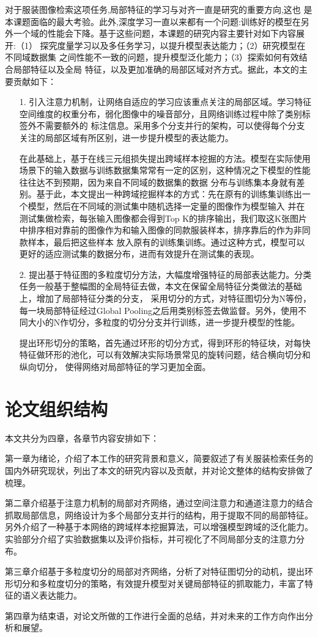 对于服装图像检索这项任务,局部特征的学习与对齐一直是研究的重要方向,这也
是本课题面临的最大考验。此外,深度学习一直以来都有一个问题:训练好的模型在另
外一个域的性能会下降。基于这些问题，本课题的研究内容主要针对如下内容展开:（1）
探究度量学习以及多任务学习，以提升模型表达能力；（2）研究模型在不同域数据集
之间性能不一致的问题，提升模型泛化能力；（3）探索如何有效结合局部特征以及全局
特征，以及更加准确的局部区域对齐方式。据此，本文的主要贡献如下：
\begin{itemize}
  \item [1.] 引入注意力机制，让网络自适应的学习应该重点关注的局部区域。学习特征空间维度的权重分布，弱化图像中的噪音部分，且网络训练过程中除了类别标签外不需要额外的
    标注信息。采用多个分支并行的架构，可以使得每个分支关注的局部区域有所区别，进一步提升模型的表达能力。
    
    在此基础上，基于在线三元组损失提出跨域样本挖掘的方法。模型在实际使用场景下的输入数据与训练数据集常常有一定的区别，这种情况之下模型的性能往往达不到预期，因为来自不同域的数据集的数据
    分布与训练集本身就有差别。基于此，本文提出一种跨域挖掘样本的方式：先在原有的训练集训练出一个模型，然后在不同域的测试集中随机选择一定量的图像作为模型输入
    并在测试集做检索，每张输入图像都会得到Top K的排序输出，我们取这K张图片中排序相对靠前的图像作为和输入图像的同款服装样本，排序靠后的作为非同款样本，最后把这些样本
    放入原有的训练集训练。通过这种方式，模型可以更好的适应测试集的数据分布，进而有效提升在测试集的表现。
  
  \item [2.] 提出基于特征图的多粒度切分方法，大幅度增强特征的局部表达能力。分类任务一般基于整幅图的全局特征去做，本文在保留全局特征分类做法的基础上，增加了局部特征分类的分支，
    采用切分的方式，对特征图切分为N等份，每一块局部特征经过Global Pooling之后用类别标签去做监督。另外，使用不同大小的N作切分，多粒度的切分分支并行训练，进一步提升模型的性能。

    提出环形切分的策略，首先通过环形的切分方式，得到环形的特征块，对每快特征做环形的池化，可以有效解决实际场景常见的旋转问题，结合横向切分和纵向切分，
    使得网络对局部特征的学习更加全面。

\end{itemize}

\section{论文组织结构}
本文共分为四章，各章节内容安排如下：

第一章为绪论，介绍了本工作的研究背景和意义，简要叙述了有关服装检索任务的国内外研究现状，列出了本文的研究内容以及贡献，并对论文整体的结构安排做了梳理。

第二章介绍基于注意力机制的局部对齐网络，通过空间注意力和通道注意力的结合抓取局部信息，网络设计为多个局部分支并行的结构，用于提取不同的局部特征。
另外介绍了一种基于本网络的跨域样本挖掘算法，可以增强模型跨域的泛化能力。实验部分介绍了实验数据集以及评价指标，并可视化了不同局部分支的注意力分布。

第三章介绍基于多粒度切分的局部对齐网络，分析了对特征图切分的动机，提出环形切分和多粒度切分的策略，有效提升模型对关键局部特征的抓取能力，丰富了特征的语义表达能力。

第四章为结束语，对论文所做的工作进行全面的总结，并对未来的工作方向作出分析和展望。
